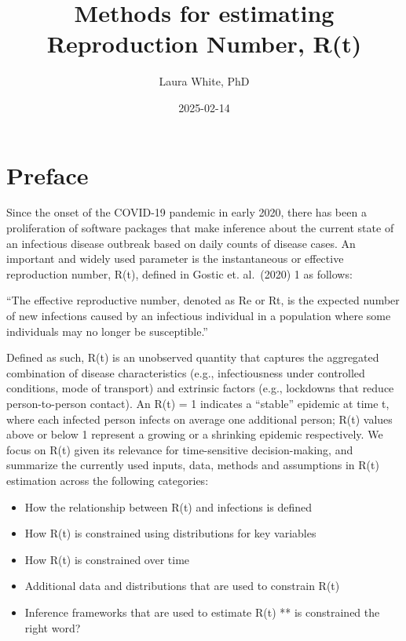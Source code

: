 \documentclass[
  letterpaper,
  DIV=11,
  numbers=noendperiod]{scrreprt}
\title{Methods for estimating Reproduction Number, R(t)}
\author{Laura White, PhD}
\date{2025-02-14}
\providecommand{\tightlist}{%
  \setlength{\itemsep}{0pt}\setlength{\parskip}{0pt}}\usepackage{longtable,booktabs,array}
\renewcommand*\contentsname{Table of contents}
\newcommand\contentsname{Table of contents}
\begin{document}
\maketitle

\renewcommand*\contentsname{Table of contents}
{
\hypersetup{linkcolor=}
\setcounter{tocdepth}{2}
\tableofcontents
}


\chapter*{Preface}\label{preface}


Since the onset of the COVID-19 pandemic in early 2020, there has been a
proliferation of software packages that make inference about the current
state of an infectious disease outbreak based on daily counts of disease
cases. An important and widely used parameter is the instantaneous or
effective reproduction number, R(t), defined in Gostic et. al.~(2020) 1
as follows:

``The effective reproductive number, denoted as Re or Rt, is the
expected number of new infections caused by an infectious individual in
a population where some individuals may no longer be susceptible.''

Defined as such, R(t) is an unobserved quantity that captures the
aggregated combination of disease characteristics (e.g., infectiousness
under controlled conditions, mode of transport) and extrinsic factors
(e.g., lockdowns that reduce person-to-person contact). An R(t) = 1
indicates a ``stable'' epidemic at time t, where each infected person
infects on average one additional person; R(t) values above or below 1
represent a growing or a shrinking epidemic respectively. We focus on
R(t) given its relevance for time-sensitive decision-making, and
summarize the currently used inputs, data, methods and assumptions in
R(t) estimation across the following categories:

\begin{itemize}
\tightlist
\item
  How the relationship between R(t) and infections is defined
\item
  How R(t) is constrained using distributions for key variables
\item
  How R(t) is constrained over time
\item
  Additional data and distributions that are used to constrain R(t)
\item
  Inference frameworks that are used to estimate R(t) ** is constrained
  the right word?
\end{itemize}
\end{document}
